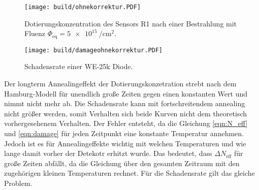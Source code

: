 \begin{figure}
    \texttt{[image: build/ohnekorrektur.PDF]}
    \caption{Dotierungskonzentration des Sensors R1 nach einer Bestrahlung mit Fluenz $\Phi_{\mathrm{eq}} = \SI{5e15}{\per\centi\meter\squared}.$}
    \label{fig:N_eff_ohne}
\end{figure}

\begin{figure}
    \texttt{[image: build/damageohnekorrektur.PDF]}
    \caption{Schadensrate einer WE-25k Diode.}
    \label{fig:damage_ohne}
\end{figure}


Der longterm Annealingeffekt der Dotierungskonzetration strebt nach dem Hamburg-Modell
für unendlich große Zeiten gegen einen konstanten Wert und nimmt nicht mehr
ab. Die Schadensrate kann mit fortschreitendem annealing nicht
größer werden, somit Verhalten sich beide Kurven nicht dem theoretisch
vorhergesehenem Verhalten.
Der Fehler entsteht, da die Gleichung \ref{eqn:N_eff} und \ref{eqn:damage} für jeden
Zeitpunkt eine konstante Temperatur annehmen. Jedoch ist es für Annealingeffekte
wichtig mit welchen Temperaturen und wie lange damit vorher der Detekotr erhitzt wurde.
Das bedeutet, dass $\Delta N_{\mathrm{eff}}$ für große Zeiten abfällt, da die Gleichung über den
gesamten Zeitraum mit den zugehörigen kleinen Temperaturen rechnet. Für
die Schadensrate gilt das gleiche Problem.

